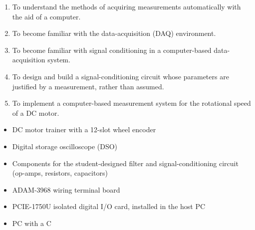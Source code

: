 
\begin{objectives}
  \begin{enumerate}
    \item To understand the methods of acquiring measurements automatically with the aid of a computer.
    \item To become familiar with the data-acquisition (DAQ) environment.
    \item To become familiar with signal conditioning in a computer-based data-acquisition system.
    \item To design and build a signal-conditioning circuit whose parameters are justified by a measurement, rather than assumed.
    \item To implement a computer-based measurement system for the rotational speed of a DC motor.
  \end{enumerate}
\end{objectives}

\begin{equipment}
  \begin{itemize}
    \item DC motor trainer with a 12-slot wheel encoder
    \item Digital storage oscilloscope (DSO)
    \item Components for the student-designed filter and signal-conditioning circuit (op-amps, resistors, capacitors)
    \item ADAM-3968 wiring terminal board
    \item PCIE-1750U isolated digital I/O card, installed in the host PC
    \item PC with a C
  \end{itemize}
\end{equipment}

